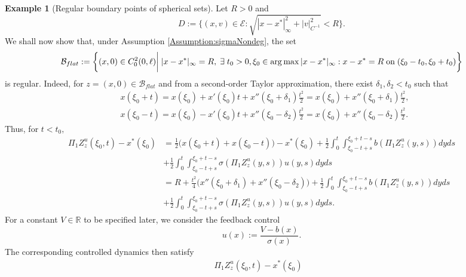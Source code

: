 \documentclass[10pt, reqno]{amsart}
\newcommand{\R}{\mathbb{R}}
\theoremstyle{definition}
\newtheorem{example}{Example}
\numberwithin{lem}{section}
\numberwithin{cor}{section}
\numberwithin{prop}{section}
\numberwithin{thm}{section}
\numberwithin{dfn}{section}
\begin{document}
\begin{example}[Regular boundary points of spherical sets]\label{ex:regularspheres}
     Let $R>0$ and 
$$D:=\bigg\{ (x, v)\in\mathcal{E}:\sqrt{ |x-x^*|^2_{\infty}+ |v|^2_{C^{-1}}}<R\bigg\}. $$
 We shall now show that, under Assumption \ref{Assumption:sigmaNondeg}, the set  
 \begin{equation*}
     \begin{aligned}
         \mathcal{B}_{flat}:=\bigg\{(x, 0)\in C_0^2(0,\ell)\bigg|\; |x-x^*|_{\infty}=R,\;\exists \;t_0>0, \xi_0\in\arg\max|x-x^*|_{\infty}: x-x^*=R\;\textnormal{on}\;(\xi_0-t_0, \xi_0+t_0)  \bigg\}
     \end{aligned}
 \end{equation*}
 is regular. Indeed, for $z=(x,0)\in \mathcal{B}_{flat}$ and from a 
second-order Taylor approximation, there exist $\delta_1, \delta_2<t_0$ such that
 \begin{equation*}
\begin{aligned}
      &x(\xi_0+t)=x(\xi_0)+ x'(\xi_0)t+x''(\xi_0+\delta_1)\frac{t^2}{2}=x(\xi_0)+x''(\xi_0+\delta_1)\frac{t^2}{2}, \\&
     x(\xi_0-t)=x(\xi_0)-x'(\xi_0)t+x''(\xi_0-\delta_2)\frac{t^2}{2}=x(\xi_0)+x''(\xi_0-\delta_2)\frac{t^2}{2}.
\end{aligned}
\end{equation*}
 Thus, for $t<t_0,$ 
 \begin{equation*}
     \begin{aligned}
     \Pi_1Z^u_z(\xi_0,t)-x^*(\xi_0)&=\frac{1}{2}\bigg(x(\xi_0+t)+  x(\xi_0-t)    \bigg)-x^*(\xi_0)+\frac{1}{2}\int_0^{t}\int_{\xi_0-t+s}^{\xi_0+t-s}b(\Pi_1Z^u_z(y, s))dyds\\&
     +\frac{1}{2}\int_0^{t}\int_{\xi_0-t+s}^{\xi_0+t-s}\sigma(\Pi_1Z^u_z(y, s))u(y,s)dyds\\&
      =   R+\frac{t^2}{4}\bigg(x''(\xi_0+\delta_1)+x''(\xi_0-\delta_2) \bigg)+\frac{1}{2}\int_0^{t}\int_{\xi_0-t+s}^{\xi_0+t-s}b(\Pi_1Z^u_z(y, s))dyds\\&
      +\frac{1}{2}\int_0^{t}\int_{\xi_0-t+s}^{\xi_0+t-s}\sigma(\Pi_1Z^u_z(y, s))u(y,s)dyds.
\end{aligned}
\end{equation*}
For a constant $V\in\R$ to be specified later, we consider the feedback control  
$$u(x):=\frac{V-b(x)}{\sigma(x)}.     $$
The corresponding controlled dynamics then satisfy
\begin{equation*}
     \begin{aligned}
     \Pi_1Z^u_z(\xi_0,t)-x^*(\xi_0)&

\end{aligned}
\end{equation*}
\end{example}
\end{document}
